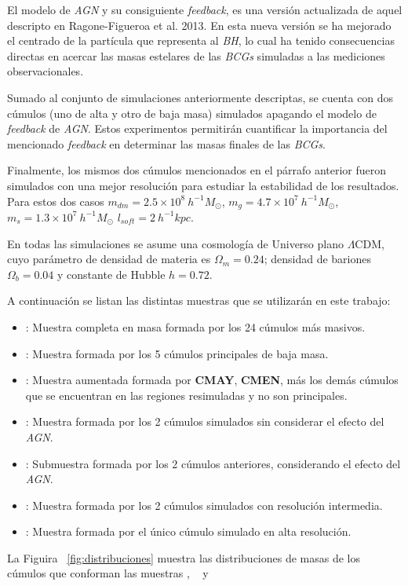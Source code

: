 El modelo de {\it AGN} y su consiguiente {\it feedback}, es una versi\'on actualizada de aquel descripto en Ragone-Figueroa 
et al. 2013. En esta nueva versi\'on se ha mejorado el centrado de la part\'icula que representa al {\it BH}, lo cual ha tenido 
consecuencias directas en acercar las masas estelares de las {\it BCGs} simuladas a las mediciones observacionales. 

Sumado al conjunto de simulaciones anteriormente descriptas, se cuenta con dos c\'umulos (uno de alta y otro de baja masa) simulados
apagando el modelo de {\it feedback} de {\it AGN}.
Estos experimentos permitir\'an cuantificar la importancia del mencionado
{\it feedback} en determinar las masas finales de las {\it BCGs}.

Finalmente, los mismos dos c\'umulos mencionados en el p\'arrafo anterior fueron simulados con una mejor resoluci\'on 
para estudiar la estabilidad de los resultados. Para estos dos
casos $m_{dm}=2.5\times10^8~h^{-1}M_{\odot}$, 
$m_{g}=4.7\times10^7~h^{-1}M_{\odot}$,
$m_{s}=1.3\times10^7~h^{-1}M_{\odot}$  $l_{soft}=2~h^{-1}kpc$. 

En todas las simulaciones se asume una cosmolog\'ia de Universo plano $\Lambda$CDM, cuyo par\'ametro de 
densidad de materia es $\Omega_m=0.24$; densidad de bariones $\Omega_b=0.04$ y constante de Hubble $h=0.72$.

\medskip
A continuaci\'on se listan las distintas muestras que se utilizar\'an en este trabajo:

\begin{itemize}

\item \cmay: Muestra completa en masa formada por los 24 c\'umulos m\'as masivos. 
\item \cmen: Muestra formada por los 5 c\'umulos principales de baja masa. 
\item \aum: Muestra aumentada formada por {\bf CMAY}, {\bf CMEN}, m\'as
los dem\'as c\'umulos que se encuentran en las regiones resimuladas y no son principales. 
\item \agnoff: Muestra formada por los 2 c\'umulos simulados sin considerar el efecto del {\it AGN}.
\item \agnon: Submuestra formada por los 2 c\'umulos anteriores, considerando el efecto del {\it AGN}.
\item \mr: Muestra formada por los 2 c\'umulos simulados con resoluci\'on intermedia.
\item \hr: Muestra formada por el \'unico c\'umulo simulado en alta resoluci\'on.

\end{itemize}
La Figuira ~\ref{fig:distribuciones} muestra las distribuciones de masas 
de los c\'umulos que conforman las muestras \cmay, \cmen~ y \aum


